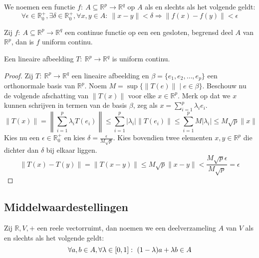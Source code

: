 \documentclass[main.tex]{subfiles}
\begin{document}
\begin{de}
  We noemen een functie $f:\ A \subseteq \mathbb{R}^{p} \rightarrow \mathbb{R}^{q}$  op $A$ als en slechts als het volgende geldt:
  \[ \forall \epsilon \in \mathbb{R}_{0}^{+}, \exists \delta \in \mathbb{R}_{0}^{+}, \forall x,y \in A:\ \|x-y\| < \delta \Rightarrow \|f(x)-f(y)\| < \epsilon \]
\end{de}

\begin{st}
  Zij $f:\ A \subseteq \mathbb{R}^{p} \rightarrow \mathbb{R}^{q}$ een continue functie op een een gesloten, begrensd deel $A$ van $\mathbb{R}^{p}$, dan is $f$ uniform continu.
\end{st}

\begin{st}
  Een lineaire afbeelding $T:\ \mathbb{R}^{p}\rightarrow \mathbb{R}^{q}$ is uniform continu.

  \begin{proof}
    Zij $T:\ \mathbb{R}^{p}\rightarrow \mathbb{R}^{q}$ een lineaire afbeelding en $\beta = \{e_{1},e_{2},\dotsc,e_{p}\}$ een orthonormale basis van $\mathbb{R}^{p}$.
    Noem $M = \sup\{\|T(e)\| \mid e \in \beta \}$.
    Beschouw nu de volgende afschatting van $\|T(x)\|$ voor elke $x\in \mathbb{R}^{p}$.
    Merk op dat we $x$ kunnen schrijven in termen van de basis $\beta$, zeg als $x = \sum_{i=1}^{p}\lambda_{i}e_{i}$.
    \[
    \|T(x)\|
    = \left\| \sum_{i=1}^{p}\lambda_{i}T(e_{i}) \right\|
    \le \sum_{i=1}^{p} |\lambda_{i}|\|T(e_{i})\|
    \le \sum_{i=1}^{p} M |\lambda_{i}|
    \le M \sqrt{p} \|x\|
    \]
    Kies nu een $\epsilon \in \mathbb{R}_{0}^{+}$ en kies $\delta = \frac{\epsilon}{M\sqrt{p}}$.
    Kies bovendien twee elementen $x,y\in \mathbb{R}^{p}$ die dichter dan $\delta$ bij elkaar liggen.
    \[ \|T(x)-T(y)\| = \|T(x-y)\| \le M\sqrt{p}\|x-y\| < \frac{M \sqrt{p}\epsilon}{M\sqrt{p}} = \epsilon \]
  \end{proof}
\feed
\end{st}

\subsection{Middelwaardestellingen}

\begin{de}
  Zij $\mathbb{R},V,+$ een reele vectorruimt, dan noemen we een deelverzameling $A$ van $V$  als en slechts als het volgende geldt:
  \[ \forall a,b \in A, \forall \lambda \in \interval{0}{1}:\ (1-\lambda)a+\lambda b \in A \]
\end{de}
\end{document}
